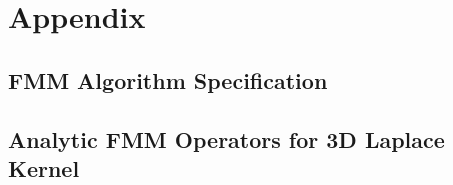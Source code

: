 \chapter{Appendix}
\section{FMM Algorithm Specification}

\section{Analytic FMM Operators for 3D Laplace Kernel}
